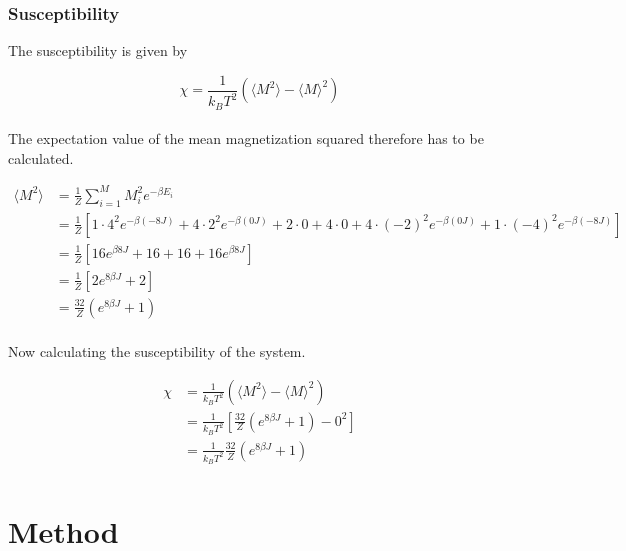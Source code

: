 \documentclass{article}
\begin{document}
\subsubsection{Susceptibility}

The susceptibility is given by

\begin{equation}    \label{eq:susceptibility}
    \chi = \frac{1}{k_B T^2} \left( \langle M^2 \rangle - \langle M \rangle ^2 \right)
\end{equation} \\

The expectation value of the mean magnetization squared therefore has to be calculated.

\begin{align*}
  \langle M^2 \rangle &= \frac{1}{Z} \sum _{i=1} ^M M_i^2 e^{- \beta E_i} \\
  &= \frac{1}{Z} \left[1 \cdot 4^2 e^{- \beta (-8J)} + 4 \cdot 2^2 e^{- \beta (0J)} + 2 \cdot 0 + 4 \cdot 0 + 4 \cdot (-2)^2 e^{- \beta (0J)} + 1 \cdot (-4)^2 e^{- \beta (-8J)} \right] \\
  &= \frac{1}{Z} \left[ 16 e^{\beta 8J} + 16 + 16 + 16 e^{ \beta 8J} \right] \\
  &= \frac{1}{Z} \left[ 2 e^{8 \beta J} + 2 \right] \\
  &= \frac{32}{Z} \left( e^{8 \beta J} + 1 \right) \\
\end{align*}

Now calculating the susceptibility of the system.

\begin{align*}
    \chi &= \frac{1}{k_B T^2} \left( \langle M^2 \rangle - \langle M \rangle ^2 \right) \\
    &= \frac{1}{k_B T^2} \left[ \frac{32}{Z} \left( e^{8 \beta J} + 1 \right) - 0^2 \right] \\
    &= \frac{1}{k_B T^2} \frac{32}{Z} \left( e^{8 \beta J} + 1 \right) \\
\end{align*}







\vspace{1cm}

\section{Method} \label{sec:Method}
\end{document}
